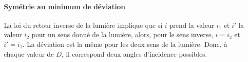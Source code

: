 \paragraph{Symétrie au minimum de déviation}
La loi du retour inverse de la lumière implique que si $i$ prend la valeur $i_1$ et $i'$ la valeur $i_2$ pour un sens donné de la lumière, alors, pour le sens inverse, $i=i_2$ et $i'=i_1$. La déviation est la même pour les deux sens de la lumière. Donc, à chaque valeur de $D$, il correspond deux angles d'incidence possibles.
